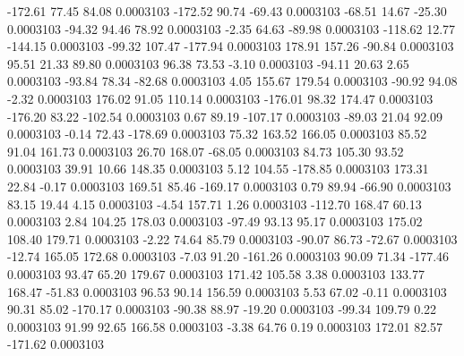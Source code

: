      -172.61       77.45       84.08     0.0003103
     -172.52       90.74      -69.43     0.0003103
      -68.51       14.67      -25.30     0.0003103
      -94.32       94.46       78.92     0.0003103
       -2.35       64.63      -89.98     0.0003103
     -118.62       12.77     -144.15     0.0003103
      -99.32      107.47     -177.94     0.0003103
      178.91      157.26      -90.84     0.0003103
       95.51       21.33       89.80     0.0003103
       96.38       73.53       -3.10     0.0003103
      -94.11       20.63        2.65     0.0003103
      -93.84       78.34      -82.68     0.0003103
        4.05      155.67      179.54     0.0003103
      -90.92       94.08       -2.32     0.0003103
      176.02       91.05      110.14     0.0003103
     -176.01       98.32      174.47     0.0003103
     -176.20       83.22     -102.54     0.0003103
        0.67       89.19     -107.17     0.0003103
      -89.03       21.04       92.09     0.0003103
       -0.14       72.43     -178.69     0.0003103
       75.32      163.52      166.05     0.0003103
       85.52       91.04      161.73     0.0003103
       26.70      168.07      -68.05     0.0003103
       84.73      105.30       93.52     0.0003103
       39.91       10.66      148.35     0.0003103
        5.12      104.55     -178.85     0.0003103
      173.31       22.84       -0.17     0.0003103
      169.51       85.46     -169.17     0.0003103
        0.79       89.94      -66.90     0.0003103
       83.15       19.44        4.15     0.0003103
       -4.54      157.71        1.26     0.0003103
     -112.70      168.47       60.13     0.0003103
        2.84      104.25      178.03     0.0003103
      -97.49       93.13       95.17     0.0003103
      175.02      108.40      179.71     0.0003103
       -2.22       74.64       85.79     0.0003103
      -90.07       86.73      -72.67     0.0003103
      -12.74      165.05      172.68     0.0003103
       -7.03       91.20     -161.26     0.0003103
       90.09       71.34     -177.46     0.0003103
       93.47       65.20      179.67     0.0003103
      171.42      105.58        3.38     0.0003103
      133.77      168.47      -51.83     0.0003103
       96.53       90.14      156.59     0.0003103
        5.53       67.02       -0.11     0.0003103
       90.31       85.02     -170.17     0.0003103
      -90.38       88.97      -19.20     0.0003103
      -99.34      109.79        0.22     0.0003103
       91.99       92.65      166.58     0.0003103
       -3.38       64.76        0.19     0.0003103
      172.01       82.57     -171.62     0.0003103
